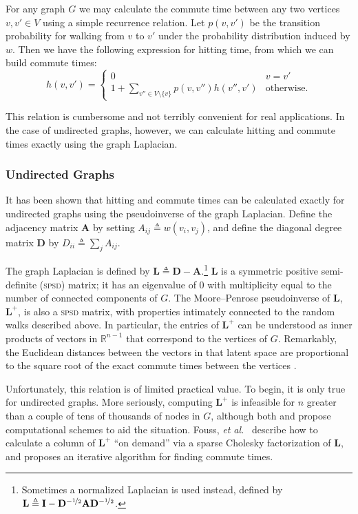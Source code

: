 \documentclass{acm_proc_article-sp}
\newcommand{\bm}[1]{\mathbf{#1}}
\newcommand{\deq}{\triangleq}
\newcommand{\R}{\mathbb{R}}
\begin{document}
For any graph $G$ we may calculate the commute time between any two
vertices $v, v' \in V$ using a simple recurrence relation.  Let $p(v,
v')$ be the transition probability for walking from $v$ to $v'$ under
the probability distribution induced by $w$.  Then we have the
following expression for hitting time, from which we can build commute
times:
\begin{equation}\label{hittingiterative}
  h(v, v') = 
  \begin{cases}
    0 & v = v' \\
    1 + \sum_{v'' \in V \setminus \lbrace v \rbrace} p(v, v'') h(v'', v') & \text{otherwise.}
  \end{cases}
\end{equation}

This relation is cumbersome and not terribly convenient for real
applications.  In the case of undirected graphs, however, we can
calculate hitting and commute times exactly using the graph Laplacian.

\subsubsection{Undirected Graphs}

It has been shown \citep{fouss, brand} that hitting and commute times
can be calculated exactly for undirected graphs using the
pseudoinverse of the graph Laplacian.  Define the adjacency matrix
$\bm{A}$ by setting $A_{ij} \deq w(v_i, v_j)$, and define the diagonal
degree matrix $\bm{D}$ by $D_{ii} \deq \sum_j A_{ij}$.

The graph Laplacian is defined by $\bm{L} \deq \bm{D} -
\bm{A}$.\footnote{Sometimes a normalized Laplacian is used instead,
  defined by $\bm{L} \deq \bm{I} -
  \bm{D}^{-\nicefrac{1}{2}}\bm{A}\bm{D}^{-\nicefrac{1}{2}}$.}
$\bm{L}$ is a symmetric positive semi-definite (\textsc{spsd}) matrix;
it has an eigenvalue of 0 with multiplicity equal to the number of
connected components of $G$.  The Moore--Penrose pseudoinverse of
$\bm{L}$, $\bm{L}^+$, is also a \textsc{spsd} matrix, with properties
intimately connected to the random walks described above.  In
particular, the entries of $\bm{L}^+$ can be understood as inner
products of vectors in $\R^{n-1}$ that correspond to the vertices of
$G$.  Remarkably, the Euclidean distances between the vectors in that
latent space are proportional to the square root of the exact commute
times between the vertices \citep{fouss}.

Unfortunately, this relation is of limited practical value.  To begin,
it is only true for undirected graphs.  More seriously, computing
$\bm{L}^+$ is infeasible for $n$ greater than a couple of tens of
thousands of nodes in $G$, although both \citep{fouss} and
\citep{brand} propose computational schemes to aid the situation.
Fouss, \emph{et al.}\ \citep{fouss} describe how to calculate a
column of $\bm{L}^+$ ``on demand'' via a sparse Cholesky factorization
of $\bm{L}$, and \citep{brand} proposes an iterative algorithm for
finding commute times.
\end{document}
